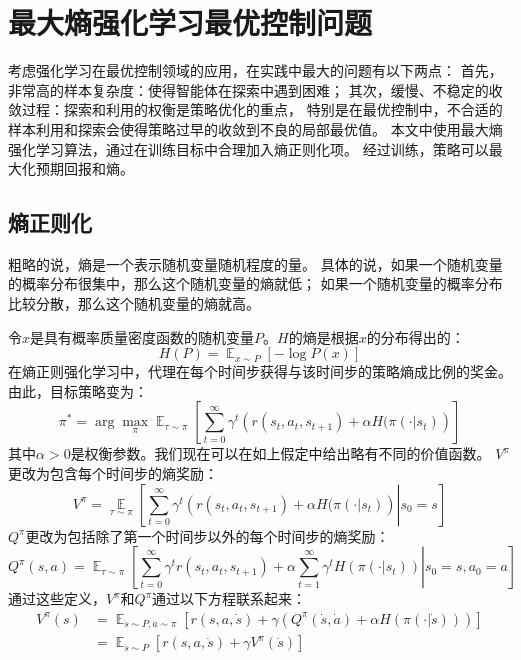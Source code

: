 \documentclass[AutoFakeBold]{LZUThesis}
\begin{document}
\section{最大熵强化学习最优控制问题}
考虑强化学习在最优控制领域的应用，在实践中最大的问题有以下两点：
首先，非常高的样本复杂度：使得智能体在探索中遇到困难；
其次，缓慢、不稳定的收敛过程：探索和利用的权衡是策略优化的重点，
特别是在最优控制中，不合适的样本利用和探索会使得策略过早的收敛到不良的局部最优值。
本文中使用最大熵强化学习算法，通过在训练目标中合理加入熵正则化项。
经过训练，策略可以最大化预期回报和熵。

\subsection{熵正则化}
粗略的说，熵是一个表示随机变量随机程度的量。
具体的说，如果一个随机变量的概率分布很集中，那么这个随机变量的熵就低；
如果一个随机变量的概率分布比较分散，那么这个随机变量的熵就高。

令$x$是具有概率质量密度函数的随机变量$P$。$H$的熵是根据$x$的分布得出的：
\begin{equation*}
  H(P) = \mathop{\mathbb{E}}_{x \sim P} \left[ - \log P(x) \right]
\end{equation*}
在熵正则强化学习中，代理在每个时间步获得与该时间步的策略熵成比例的奖金。
由此，目标策略变为：
\begin{equation}
  \pi^* = \arg \max_{\pi} \mathop{\mathbb{E}}_{\tau\sim\pi} 
  \left[ \sum_{t = 0}^{\infty} \gamma^t \left( r(s_t, a_t, s_{t + 1}) 
  + \alpha H(\pi(\cdot | s_t) \right) \right]
\end{equation}
其中$\alpha > 0$是权衡参数。我们现在可以在如上假定中给出略有不同的价值函数。
$V^{\pi}$更改为包含每个时间步的熵奖励：
\begin{equation}
  V^\pi = \mathop{\mathbb{E}}\limits_{\tau\sim\pi} 
  \left[ \sum_{t = 0}^{\infty} \gamma^t \left( r(s_t, a_t, s_{t + 1}) 
  + \alpha H(\pi(\cdot | s_t) \right) \left|\right. s_0 = s \right]
\end{equation}
$Q^\pi$更改为包括除了第一个时间步以外的每个时间步的熵奖励：
\begin{equation}
  Q^\pi(s, a) = \mathop{\mathbb{E}}_{\tau \sim \pi} \left[ \sum_{t = 0}^{\infty} \gamma^t
  r(s_t, a_t, s_{t + 1}) + \alpha \sum_{t = 1}^{\infty} \gamma^t H(\pi(\cdot | s_t))
  \left|\right. s_0 = s, a_0 = a \right]
\end{equation}
通过这些定义，$V^\pi$和$Q^\pi$通过以下方程联系起来：
\begin{equation}
  \begin{aligned}
    V^\pi(s) &= \mathop{\mathbb{E}}_{\dot s \sim P, \dot a \sim \pi}
    \left[ r(s, a, \dot s) + \gamma(Q^\pi(\dot s, \dot a) + 
    \alpha H(\pi(\cdot | \dot s))) \right] \\
    &= \mathop{\mathbb{E}}_{\dot s \sim P}
    \left[ r(s, a, \dot s) + \gamma V^\pi(\dot s) \right]
  \end{aligned}
\end{equation}
\end{document}

